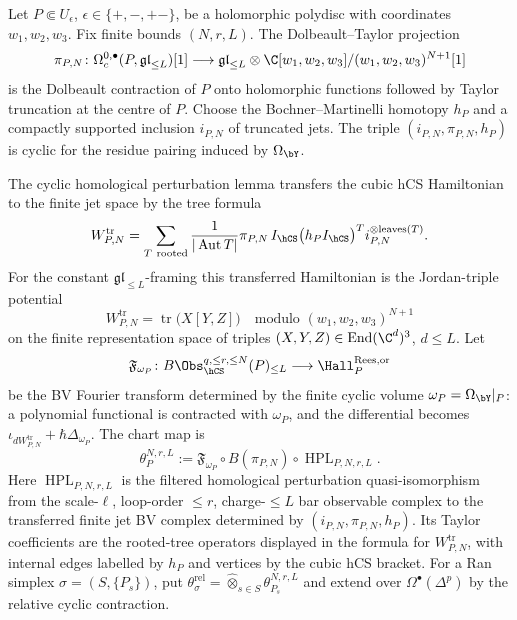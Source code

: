 \begin{construction}
\label{constr:conifold-finite-hcs-rees-hall-chart-map}
Let \(P\Subset U_\epsilon\), \(\epsilon\in\{+,-,+-\}\), be a
holomorphic polydisc with coordinates \(w_1,w_2,w_3\).  Fix finite
bounds \((N,r,L)\).  The Dolbeault--Taylor projection
\[
 \pi_{P,N}\colon
 \Omega_c^{0,\bullet}(P,\mathfrak{gl}_{\le L})[1]
 \longrightarrow
 \mathfrak{gl}_{\le L}\otimes
 \C[w_1,w_2,w_3]/(w_1,w_2,w_3)^{N+1}[1]
\]
is the Dolbeault contraction of \(P\) onto holomorphic functions
followed by Taylor truncation at the centre of \(P\).  Choose the
Bochner--Martinelli homotopy \(h_P\) and a compactly supported
inclusion \(i_{P,N}\) of truncated jets.  The triple
\((i_{P,N},\pi_{P,N},h_P)\) is cyclic for the residue pairing induced
by \(\Omega_{\bY}\).

The cyclic homological perturbation lemma transfers the cubic hCS
Hamiltonian to the finite jet space by the tree formula
\[
 W_{P,N}^{\mathrm{tr}}
 =
 \sum_{T\ \mathrm{rooted}}
 \frac{1}{|\operatorname{Aut}T|}
 \pi_{P,N}\, I_{\hCS}
 \bigl(h_P I_{\hCS}\bigr)^T i_{P,N}^{\otimes \mathrm{leaves}(T)} .
\]
For the constant \(\mathfrak{gl}_{\le L}\)-framing this transferred
Hamiltonian is the Jordan-triple potential
\[
 W_{P,N}^{\mathrm{tr}}
 =
 \operatorname{tr}\bigl(X[Y,Z]\bigr)
 \quad
 \text{modulo }(w_1,w_2,w_3)^{N+1}
\]
on the finite representation space of triples
\((X,Y,Z)\in\operatorname{End}(\C^d)^3\), \(d\le L\).  Let
\[
 \mathfrak F_{\omega_P}\colon
 B\Obs_{\hCS}^{q,\le r,\le N}(P)_{\le L}
 \longrightarrow
 \Hall_{P}^{\mathrm{Rees},\mathrm{or}}
\]
be the BV Fourier transform determined by the finite cyclic volume
\(\omega_P=\Omega_{\bY}|_P\): a polynomial functional is contracted
with \(\omega_P\), and the differential becomes
\(\iota_{dW_{P,N}^{\mathrm{tr}}}+\hbar\Delta_{\omega_P}\).  The chart
map is
\[
 \theta_{P}^{N,r,L}
 :=
 \mathfrak F_{\omega_P}\circ
 B(\pi_{P,N})\circ
 \operatorname{HPL}_{P,N,r,L}.
\]
Here \(\operatorname{HPL}_{P,N,r,L}\) is the filtered homological
perturbation quasi-isomorphism from the scale-\(\ell\), loop-order
\(\le r\), charge-\(\le L\) bar observable complex to the transferred
finite jet BV complex determined by
\((i_{P,N},\pi_{P,N},h_P)\).  Its Taylor coefficients are the rooted-tree
operators displayed in the formula for \(W_{P,N}^{\mathrm{tr}}\), with
internal edges labelled by \(h_P\) and vertices by the cubic hCS bracket.
For a Ran simplex \(\sigma=(S,\{P_s\})\), put
\(\theta_\sigma^{\mathrm{rel}}=\widehat\otimes_{s\in S}\theta_{P_s}^{N,r,L}\)
and extend over \(\Omega^\bullet(\Delta^p)\) by the relative cyclic
contraction.
\end{construction}

